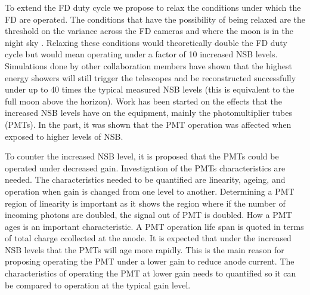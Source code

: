 To extend the FD duty cycle we propose to relax the conditions under which the FD are operated. The conditions that have the possibility of being relaxed are the threshold on the variance across the FD cameras and where the moon is in the night sky \cite{GAP1994-034,GAP2011-039}. Relaxing these conditions would theoretically double the FD duty cycle but would mean operating under a factor of 10 increased NSB levels.  Simulations done by other collaboration members have shown that the highest energy showers will still trigger the telescopes and be reconstructed successfully under up to 40 times the typical measured NSB levels (this is equivalent to the full moon above the horizon). Work has been started on the effects that the increased NSB levels have on the equipment, mainly the photomultiplier tubes (PMTs). In the past, it was shown that the PMT operation was affected when exposed to higher levels of NSB.



To counter the increased NSB level, it is proposed that the PMTs could be operated under decreased gain. Investigation of the PMTs characteristics are needed. The characteristics needed to be quantified are linearity, ageing, and operation when gain is changed from one level to another. Determining a PMT region of linearity is important as it shows the region where if the number of incoming photons are doubled, the signal out of PMT is doubled. How a PMT ages is an important characteristic. A PMT operation life span is quoted in terms of total charge ccollected at the anode. It is expected that under the increased NSB levels that the PMTs will age more rapidly. This is the main reason for proposing operating the PMT under a lower gain to reduce anode current. The characteristics of  operating the PMT at lower gain needs to quantified so it can be compared to operation at the typical gain level. 
